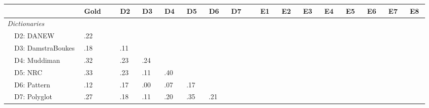 \newcommand{\squeeze}[1]{$\!\!\!\!\!\!\!$#1$\!\!\!\!\!\!$}
\newcommand{\sectbreak}[1]{$\!\!\!\!\!\!\!\!\!$}
\begin{tabularx}{\textwidth}{lXlclllllllllllllll}
\toprule

& $\!\!\!\!\!$& \squeeze{ Gold }
& $\!\!\!\!\!$& \squeeze{ D2 }& \squeeze{ D3 }& \squeeze{ D4 }& \squeeze{ D5 }& \squeeze{ D6 }& \squeeze{ D7 }
& $\!\!\!\!\!$& \squeeze{ E1 }& \squeeze{ E2 }& \squeeze{ E3 }& \squeeze{ E4 }& \squeeze{ E5 }& \squeeze{ E6 }& \squeeze{ E7 }& \squeeze{ E8 }
\\
\midrule




 
\multicolumn{10}{l}{\emph{ Dictionaries }} \\
& D2: DANEW&\cellcolor[gray]{0.88}
 \squeeze{ .22 } &\sectbreak\ &&&&&& &\sectbreak\ &&&&&&&&\\
& D3: DamstraBoukes&\cellcolor[gray]{0.90}
 \squeeze{ .18 } &\sectbreak\ &\cellcolor[gray]{0.94}
 \squeeze{ .11 }&&&&& &\sectbreak\ &&&&&&&&\\
& D4: Muddiman&\cellcolor[gray]{0.83}
 \squeeze{ .32 } &\sectbreak\ &\cellcolor[gray]{0.88}
 \squeeze{ .23 }&\cellcolor[gray]{0.87}
 \squeeze{ .24 }&&&& &\sectbreak\ &&&&&&&&\\
& D5: NRC&\cellcolor[gray]{0.83}
 \squeeze{ .33 } &\sectbreak\ &\cellcolor[gray]{0.88}
 \squeeze{ .23 }&\cellcolor[gray]{0.94}
 \squeeze{ .11 }&\cellcolor[gray]{0.79}
 \squeeze{ .40 }&&& &\sectbreak\ &&&&&&&&\\
& D6: Pattern&\cellcolor[gray]{0.93}
 \squeeze{ .12 } &\sectbreak\ &\cellcolor[gray]{0.90}
 \squeeze{ .17 }&\cellcolor[gray]{1.00}
 \squeeze{ .00 }&\cellcolor[gray]{0.96}
 \squeeze{ .07 }&\cellcolor[gray]{0.91}
 \squeeze{ .17 }&& &\sectbreak\ &&&&&&&&\\
& D7: Polyglot&\cellcolor[gray]{0.86}
 \squeeze{ .27 } &\sectbreak\ &\cellcolor[gray]{0.90}
 \squeeze{ .18 }&\cellcolor[gray]{0.93}
 \squeeze{ .11 }&\cellcolor[gray]{0.89}
 \squeeze{ .20 }&\cellcolor[gray]{0.82}
 \squeeze{ .35 }&\cellcolor[gray]{0.88}
 \squeeze{ .21 }& &\sectbreak\ &&&&&&&&\\





\end{tabularx}
